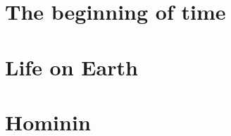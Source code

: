 \documentclass[a5paper]{article}
\begin{document}
  \section*{The beginning of time}
  

  \section*{Life on Earth}
  

  \section*{Hominin}
  
\end{document}
